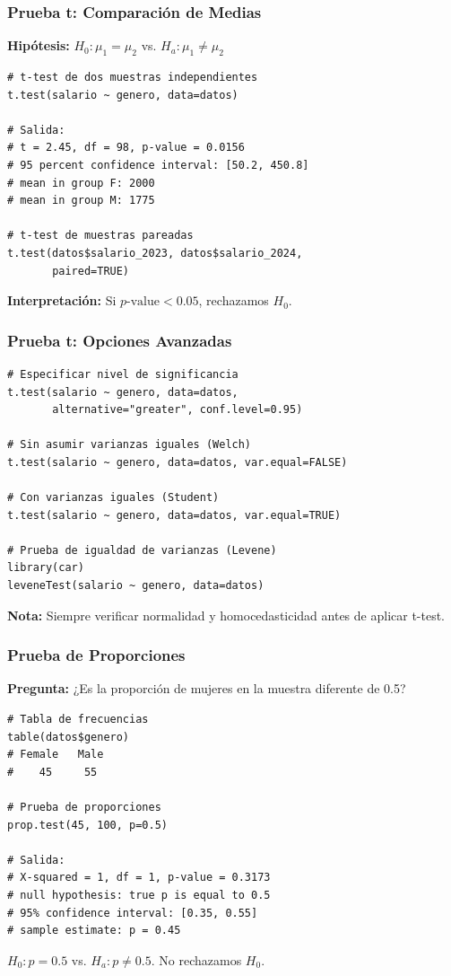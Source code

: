 \documentclass[aspectratio=169,11pt]{beamer}
\begin{document}
\begin{frame}[fragile]
  \frametitle{Prueba t: Comparación de Medias}

  \textbf{Hipótesis:} $H_0: \mu_1 = \mu_2$ vs. $H_a: \mu_1 \neq \mu_2$

  \begin{lstlisting}
# t-test de dos muestras independientes
t.test(salario ~ genero, data=datos)

# Salida:
# t = 2.45, df = 98, p-value = 0.0156
# 95 percent confidence interval: [50.2, 450.8]
# mean in group F: 2000
# mean in group M: 1775

# t-test de muestras pareadas
t.test(datos$salario_2023, datos$salario_2024,
       paired=TRUE)
  \end{lstlisting}

  \small
  \textbf{Interpretación:} Si $p\text{-value} < 0.05$, rechazamos $H_0$.
\end{frame}

\begin{frame}[fragile]
  \frametitle{Prueba t: Opciones Avanzadas}

  \begin{lstlisting}
# Especificar nivel de significancia
t.test(salario ~ genero, data=datos,
       alternative="greater", conf.level=0.95)

# Sin asumir varianzas iguales (Welch)
t.test(salario ~ genero, data=datos, var.equal=FALSE)

# Con varianzas iguales (Student)
t.test(salario ~ genero, data=datos, var.equal=TRUE)

# Prueba de igualdad de varianzas (Levene)
library(car)
leveneTest(salario ~ genero, data=datos)
  \end{lstlisting}

  \small
  \textbf{Nota:} Siempre verificar normalidad y homocedasticidad antes de aplicar t-test.
\end{frame}

\begin{frame}[fragile]
  \frametitle{Prueba de Proporciones}

  \textbf{Pregunta:} ¿Es la proporción de mujeres en la muestra diferente de 0.5?

  \begin{lstlisting}
# Tabla de frecuencias
table(datos$genero)
# Female   Male
#    45     55

# Prueba de proporciones
prop.test(45, 100, p=0.5)

# Salida:
# X-squared = 1, df = 1, p-value = 0.3173
# null hypothesis: true p is equal to 0.5
# 95% confidence interval: [0.35, 0.55]
# sample estimate: p = 0.45
  \end{lstlisting}

  \small
  $H_0: p = 0.5$ vs. $H_a: p \neq 0.5$. No rechazamos $H_0$.
\end{frame}
\end{document}
